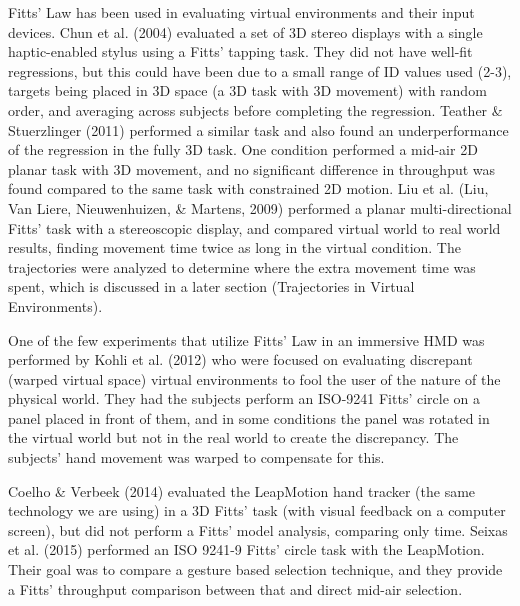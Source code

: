 Fitts' Law has been used in evaluating virtual environments and their input devices.
Chun et al.
(2004) evaluated a set of 3D stereo displays with a single haptic-enabled stylus using a Fitts' tapping task.
They did not have well-fit regressions, but this could have been due to a small range of ID values used (2-3), targets being placed in 3D space (a 3D task with 3D movement) with random order, and averaging across subjects before completing the regression.
Teather \& Stuerzlinger (2011) performed a similar task and also found an underperformance of the regression in the fully 3D task.
One condition performed a mid-air 2D planar task with 3D movement, and no significant difference in throughput was found compared to the same task with constrained 2D motion.
Liu et al.
(Liu, Van Liere, Nieuwenhuizen, \& Martens, 2009) performed a planar multi-directional Fitts' task with a stereoscopic display, and compared virtual world to real world results, finding movement time twice as long in the virtual condition.
The trajectories were analyzed to determine where the extra movement time was spent, which is discussed in a later section (Trajectories in Virtual Environments).

One of the few experiments that utilize Fitts' Law in an immersive HMD was performed by Kohli et al.
(2012) who were focused on evaluating discrepant (warped virtual space) virtual environments to fool the user of the nature of the physical world.
They had the subjects perform an ISO-9241 Fitts' circle on a panel placed in front of them, and in some conditions the panel was rotated in the virtual world but not in the real world to create the discrepancy.
The subjects' hand movement was warped to compensate for this.

Coelho \& Verbeek (2014) evaluated the LeapMotion hand tracker (the same technology we are using) in a 3D Fitts' task (with visual feedback on a computer screen), but did not perform a Fitts' model analysis, comparing only time.
Seixas et al.
(2015) performed an ISO 9241-9 Fitts' circle task with the LeapMotion.
Their goal was to compare a gesture based selection technique, and they provide a Fitts' throughput comparison between that and direct mid-air selection.

